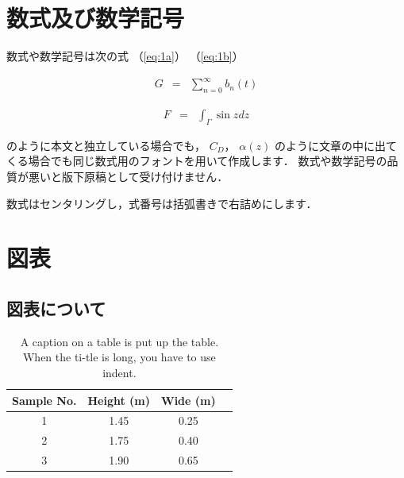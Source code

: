\section{数式及び数学記号}

数式や数学記号は次の式
（\ref{eq:1a}）
（\ref{eq:1b}）

\begin{eqnarray}
  G &=& \sum_{n = 0}^{\infty}b_{n}\left(t\right)
  \label{eq:1a}
\end{eqnarray}

\begin{eqnarray}
  F &=& \int_{\Gamma}\sin{z} dz
  \label{eq:1b}
\end{eqnarray}

\noindent
のように本文と独立している場合でも，
$C_{D}$，
$\alpha\left(z\right)$
のように文章の中に出てくる場合でも同じ数式用のフォントを用いて作成します．
数式や数学記号の品質が悪いと版下原稿として受け付けません．

数式はセンタリングし，式番号は括弧書きで右詰めにします．

\section{図表}

\subsection{図表について}

\begin{table}[tb]
  \centering
  \caption{A caption on a table is put up the table. When the ti-tle is long, you have to use indent.}
  \label{tb:example table}
  \begin{tabular}{ |c|c|c|c| }
    \hline
    Sample No. & Height (m) & Wide (m) \\
    \hline
    1          & 1.45       & 0.25     \\
    2          & 1.75       & 0.40     \\
    3          & 1.90       & 0.65     \\
    \hline
  \end{tabular}
\end{table}

